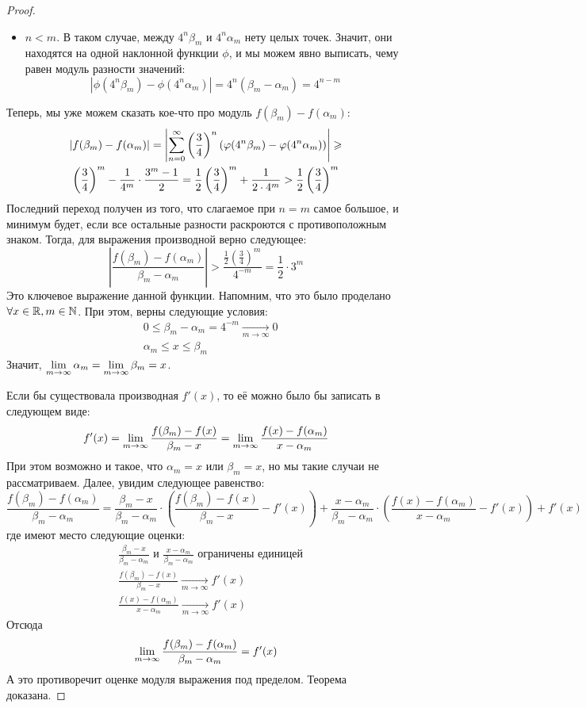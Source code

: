 \begin{proof}
\begin{itemize}
		\item $n < m$. В таком случае, между $4^n \beta_m$ и $4^n \alpha_m$ нету целых точек. Значит, они находятся на одной наклонной функции $\phi$, и мы можем явно выписать, чему равен модуль разности значений:
		\[
			|\phi(4^n\beta_m) - \phi(4^n\alpha_m)| = 4^n(\beta_m - \alpha_m) = 4^{n - m}
		\]
	\end{itemize}

	Теперь, мы уже можем сказать кое-что про модуль $f(\beta_m) - f(\alpha_m)$:
	\begin{multline*}
		|f(\beta_m) - f(\alpha_m)| = \left|\sum_{n = 0}^\infty \left(\frac{3}{4}\right)^n (\varphi(4^n\beta_m) - \varphi(4^n\alpha_m))\right| \geqslant
		\\
		\left(\frac{3}{4}\right)^m - \frac{1}{4^m} \cdot \frac{3^m - 1}{2} = \frac{1}{2}\left(\frac{3}{4}\right)^m + \frac{1}{2 \cdot 4^m} > \frac{1}{2}\left(\frac{3}{4}\right)^m
	\end{multline*}
	Последний переход получен из того, что слагаемое при $n=m$ самое большое, и минимум будет, если все остальные разности раскроются с противоположным знаком.
	Тогда, для выражения производной верно следующее:
	\[
		\left|\frac{f(\beta_m) - f(\alpha_m)}{\beta_m - \alpha_m}\right| > \frac{\frac{1}{2}\left(\frac{3}{4}\right)^m}{4^{-m}} = \frac{1}{2} \cdot 3^m
	\]
	Это ключевое выражение данной функции. Напомним, что это было проделано $\forall x \in \mathbb{R}, m \in \mathbb{N}$. При этом, верны следующие условия:
	\begin{align*}
		&{0 \le \beta_m - \alpha_m = 4^{-m} \xrightarrow[m \to \infty]{} 0}
		\\
		&{\alpha_m \le x \le \beta_m}
	\end{align*}
	Значит, $\lim\limits_{m \to \infty} \alpha_m = \lim\limits_{m \to \infty} \beta_m = x$.
	
	Если бы существовала производная $f'(x)$, то её можно было бы записать в следующем виде:
	\[
		f'(x) = \lim\limits_{m \to \infty} \frac{f(\beta_m) - f(x)}{\beta_m - x} = \lim\limits_{m \to \infty} \frac{f(x) - f(\alpha_m)}{x - \alpha_m}
	\]
	При этом возможно и такое, что $\alpha_m = x$ или $\beta_m = x$, но мы такие случаи не рассматриваем. Далее, увидим следующее равенство:
	\[
		\frac{f(\beta_m) - f(\alpha_m)}{\beta_m - \alpha_m} = \frac{\beta_m - x}{\beta_m - \alpha_m} \cdot \left(\frac{f(\beta_m) - f(x)}{\beta_m - x} - f'(x)\right) + \frac{x - \alpha_m}{\beta_m - \alpha_m} \cdot \left(\frac{f(x) - f(\alpha_m)}{x - \alpha_m} - f'(x)\right) + f'(x)
	\]
	где имеют место следующие оценки:
	\begin{align*}
		&{\frac{\beta_m - x}{\beta_m - \alpha_m} \text{ и } \frac{x - \alpha_m}{\beta_m - \alpha_m} \text{ ограничены единицей}}
		\\
		&{\frac{f(\beta_m) - f(x)}{\beta_m - x} \xrightarrow[m \to \infty]{} f'(x)}
		\\
		&{\frac{f(x) - f(\alpha_m)}{x - \alpha_m} \xrightarrow[m \to \infty]{} f'(x)}
	\end{align*}
	Отсюда
	\[
		\lim\limits_{m \to \infty} \frac{f(\beta_m) - f(\alpha_m)}{\beta_m - \alpha_m} = f'(x)
	\]
	А это противоречит оценке модуля выражения под пределом. Теорема доказана.
\end{proof}

